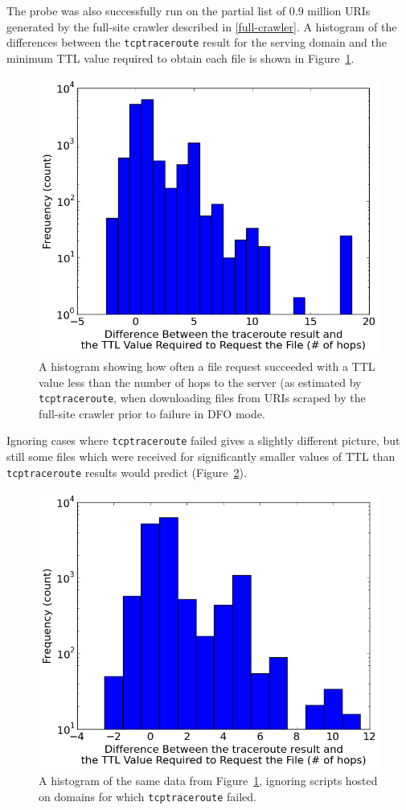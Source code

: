 The probe was also successfully run on the partial list of 0.9 million URIs generated by the full-site crawler described in \autoref{full-crawler}.
A histogram of the differences between the \texttt{tcptraceroute} result for the serving domain and the minimum TTL value required to obtain each file is shown in Figure~\ref{fig_histfull}.
\begin{figure}
	\includegraphics[width=\columnwidth]{figures/histfull}
	\caption{
		A histogram showing how often a file request succeeded with a TTL value less than the number of hops to the server (as estimated by \texttt{tcptraceroute}, when downloading files from URIs scraped by the full-site crawler prior to failure in DFO mode.
	}
	\label{fig_histfull}
\end{figure}
Ignoring cases where \texttt{tcptraceroute} failed gives a slightly different picture, but still some files which were received for significantly smaller values of TTL than \texttt{tcptraceroute} results would predict (Figure~\ref{fig_histfull-mod}).
\begin{figure}
	\includegraphics[width=\columnwidth]{figures/histfull-mod}
	\caption{
		A histogram of the same data from Figure~\ref{fig_histfull}, ignoring scripts hosted on domains for which \texttt{tcptraceroute} failed.
	}
	\label{fig_histfull-mod}
\end{figure}
